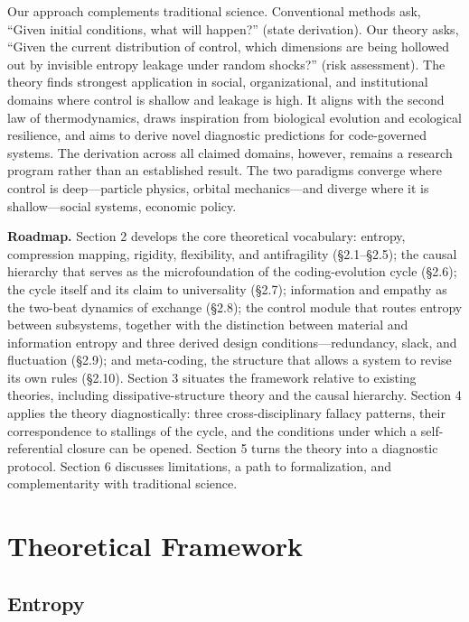 \documentclass[11pt,a4paper]{article}
\begin{document}
Our approach complements traditional science. Conventional methods ask, ``Given initial conditions, what will happen?'' (state derivation). Our theory asks, ``Given the current distribution of control, which dimensions are being hollowed out by invisible entropy leakage under random shocks?'' (risk assessment). The theory finds strongest application in social, organizational, and institutional domains where control is shallow and leakage is high. It aligns with the second law of thermodynamics, draws inspiration from biological evolution and ecological resilience, and aims to derive novel diagnostic predictions for code-governed systems. The derivation across all claimed domains, however, remains a research program rather than an established result. The two paradigms converge where control is deep---particle physics, orbital mechanics---and diverge where it is shallow---social systems, economic policy.

\textbf{Roadmap.} Section 2 develops the core theoretical vocabulary: entropy, compression mapping, rigidity, flexibility, and antifragility (\S2.1--\S2.5); the causal hierarchy that serves as the microfoundation of the coding-evolution cycle (\S2.6); the cycle itself and its claim to universality (\S2.7); information and empathy as the two-beat dynamics of exchange (\S2.8); the control module that routes entropy between subsystems, together with the distinction between material and information entropy and three derived design conditions---redundancy, slack, and fluctuation (\S2.9); and meta-coding, the structure that allows a system to revise its own rules (\S2.10). Section 3 situates the framework relative to existing theories, including dissipative-structure theory and the causal hierarchy. Section 4 applies the theory diagnostically: three cross-disciplinary fallacy patterns, their correspondence to stallings of the cycle, and the conditions under which a self-referential closure can be opened. Section 5 turns the theory into a diagnostic protocol. Section 6 discusses limitations, a path to formalization, and complementarity with traditional science.

\section{Theoretical Framework}

\subsection{Entropy}
\end{document}
